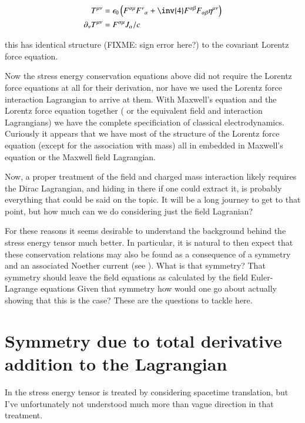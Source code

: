 \documentclass{article}
\begin{document}
\begin{align}
T^{\mu\nu} &= {\epsilon_0} \left( F^{\alpha\mu} {F^{\nu}}_{\alpha} + \inv{4} F^{\alpha\beta} F_{\alpha\beta} \eta^{\mu\nu} \right) \\
\partial_\nu T^{\mu\nu} &= F^{\alpha\mu} J_\alpha/c
\end{align}

this has identical structure (FIXME: sign error here?) to the
covariant Lorentz force equation.

Now the stress energy conservation equations above did not require
the Lorentz force equations at all for their derivation, nor have we
used the Lorentz force interaction Lagrangian to arrive at them.  
With Maxwell's equation and the Lorentz force equation together (
or the equivalent field and interaction Lagrangians) we have
the complete specificiation of classical electrodynamics.  Curiously
it
appears that we have most of the structure of the Lorentz force equation
(except for the association with mass) all in embedded in Maxwell's equation
or the Maxwell field Lagrangian.  

Now, a proper treatment of the field and charged mass interaction
likely requires the Dirac Lagrangian, and hiding in there if one
could extract it, is probably everything that could be said on the
topic.  It will be a long journey to get to that point, but how
much can we do considering just the field Lagranian?

For these reasons it seems desirable to
understand the background behind the stress energy tensor much better.
In particular, it is natural to then expect that these conservation
relations may also be found as a 
consequence of a symmetry and an associated Noether current
(see 
\cite{PJNoethersField}
).  What
is that symmetry?  That symmetry should leave the field equations as 
calculated by the field Euler-Lagrange equations 
Given that symmetry how would one go about
actually showing that this is the case?   These are the questions
to tackle here.

\section{ Symmetry due to total derivative addition to the Lagrangian }

In \cite{doran2003gap} the stress energy tensor is treated 
by considering spacetime translation, but I've unfortunately
not understood much more than vague direction in that treatment.
\end{document}
